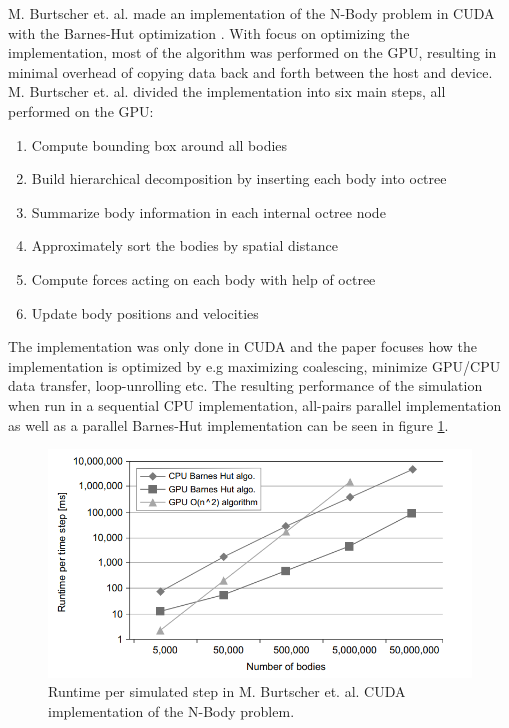M. Burtscher et. al. made an implementation of the N-Body problem in CUDA with the Barnes-Hut optimization \cite{burtscher2011efficient}. With focus on optimizing the implementation, most of the algorithm was performed on the GPU, resulting in minimal overhead of copying data back and forth between the host and device. M. Burtscher et. al. divided the implementation into six main steps, all performed on the GPU:
\begin{enumerate}
    \item Compute bounding box around all bodies
    \item Build hierarchical decomposition by inserting each body into octree
    \item Summarize body information in each internal octree node
    \item Approximately sort the bodies by spatial distance
    \item Compute forces acting on each body with help of octree
    \item Update body positions and velocities
\end{enumerate}

\noindent The implementation was only done in CUDA and the paper focuses how the implementation is optimized by e.g maximizing coalescing, minimize GPU/CPU data transfer, loop-unrolling etc. The resulting performance of the simulation when run in a sequential CPU implementation, all-pairs parallel implementation as well as a parallel Barnes-Hut implementation can be seen in figure \ref{fig:BurtscherResults}.

\begin{figure}[!htpb]
    \centering
    \includegraphics[width=\textwidth]{Introduction/Figs/CPUvsGPUn2vsBarnesHut.png}
    \caption{Runtime per simulated step in M. Burtscher et. al. CUDA implementation of the N-Body problem. \cite{burtscher2011efficient}}
    \label{fig:BurtscherResults}
\end{figure}

